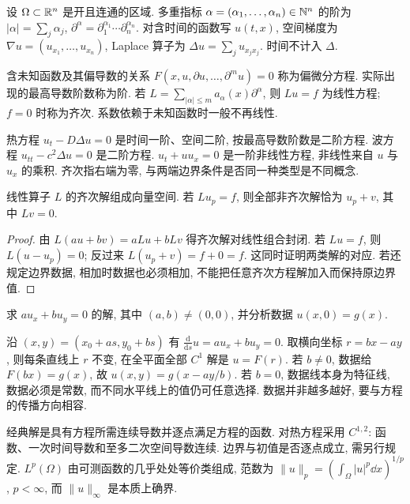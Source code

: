 \label{ch:basic}
设 $\Omega\subset\mathbb R^n$ 是开且连通的区域. 多重指标 $\alpha=(\alpha_1,\ldots,\alpha_n)\in\mathbb N^n$ 的阶为 $|\alpha|=\sum_j\alpha_j$, $\partial^\alpha=\partial_1^{\alpha_1}\cdots\partial_n^{\alpha_n}$. 对含时间的函数写 $u(t,x)$, 空间梯度为 $\nabla u=(u_{x_1},\ldots,u_{x_n})$, Laplace 算子为 $\Delta u=\sum_j u_{x_jx_j}$. 时间不计入 $\Delta$.
\begin{definition}
含未知函数及其偏导数的关系 $F(x,u,\partial u,\ldots,\partial^m u)=0$ 称为偏微分方程. 实际出现的最高导数阶数称为阶. 若 $L=\sum_{|\alpha|\le m}a_\alpha(x)\partial^\alpha$, 则 $Lu=f$ 为线性方程; $f=0$ 时称为齐次. 系数依赖于未知函数时一般不再线性.
\end{definition}
热方程 $u_t-D\Delta u=0$ 是时间一阶、空间二阶, 按最高导数阶数是二阶方程. 波方程 $u_{tt}-c^2\Delta u=0$ 是二阶方程. $u_t+uu_x=0$ 是一阶非线性方程, 非线性来自 $u$ 与 $u_x$ 的乘积. 齐次指右端为零, 与两端边界条件是否同一种类型是不同概念.
\begin{proposition}\label{prop:superposition}
线性算子 $L$ 的齐次解组成向量空间. 若 $Lu_p=f$, 则全部非齐次解恰为 $u_p+v$, 其中 $Lv=0$.
\end{proposition}
\begin{proof}
由 $L(au+bv)=aLu+bLv$ 得齐次解对线性组合封闭. 若 $Lu=f$, 则 $L(u-u_p)=0$; 反过来 $L(u_p+v)=f+0=f$. 这同时证明两类解的对应. 若还规定边界数据, 相加时数据也必须相加, 不能把任意齐次方程解加入而保持原边界值.
\end{proof}
\begin{example}
求 $a u_x+b u_y=0$ 的解, 其中 $(a,b)\ne(0,0)$, 并分析数据 $u(x,0)=g(x)$.
\end{example}
\begin{solution}
沿 $(x,y)=(x_0+as,y_0+bs)$ 有 $\frac{\mathrm d}{\mathrm ds}u=a u_x+b u_y=0$. 取横向坐标 $r=bx-ay$, 则每条直线上 $r$ 不变, 在全平面全部 $C^1$ 解是 $u=F(r)$. 若 $b\ne0$, 数据给 $F(bx)=g(x)$, 故 $u(x,y)=g(x-ay/b)$. 若 $b=0$, 数据线本身为特征线, 数据必须是常数, 而不同水平线上的值仍可任意选择. 数据并非越多越好, 要与方程的传播方向相容.
\end{solution}
\begin{definition}
经典解是具有方程所需连续导数并逐点满足方程的函数. 对热方程采用 $C^{1,2}$: 函数、一次时间导数和至多二次空间导数连续. 边界与初值是否逐点成立, 需另行规定. $L^p(\Omega)$ 由可测函数的几乎处处等价类组成, 范数为 $\|u\|_p=(\int_\Omega |u|^p\dd x)^{1/p}$, $p<\infty$, 而 $\|u\|_\infty$ 是本质上确界.
\end{definition}

